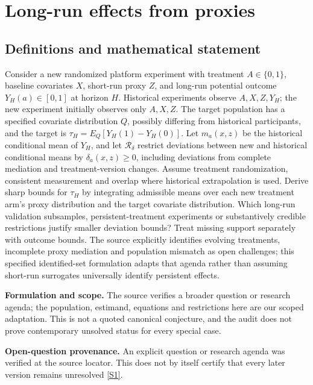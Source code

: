 \documentclass[11pt]{article}
\newcommand{\sref}[2]{\hyperlink{source:#1:#2}{[S#2]}}
\begin{document}
\section*{Long-run effects from proxies}\label{30007711}
\subsection{Definitions and mathematical statement}
Consider a new randomized platform experiment with treatment \(A\in\{0,1\}\), baseline covariates \(X\), short-run proxy \(Z\), and long-run potential outcome \(Y_H(a)\in[0,1]\) at horizon \(H\). Historical experiments observe \(A,X,Z,Y_H\); the new experiment initially observes only \(A,X,Z\). The target population has a specified covariate distribution \(Q\), possibly differing from historical participants, and the target is \(\tau_H=E_Q[Y_H(1)-Y_H(0)]\). Let \(m_a(x,z)\) be the historical conditional mean of \(Y_H\), and let \(\mathcal R_\delta\) restrict deviations between new and historical conditional means by \(\delta_a(x,z)\geq0\), including deviations from complete mediation and treatment-version changes. Assume treatment randomization, consistent measurement and overlap where historical extrapolation is used. Derive sharp bounds for \(\tau_H\) by integrating admissible means over each new treatment arm's proxy distribution and the target covariate distribution. Which long-run validation subsamples, persistent-treatment experiments or substantively credible restrictions justify smaller deviation bounds? Treat missing support separately with outcome bounds. The source explicitly identifies evolving treatments, incomplete proxy mediation and population mismatch as open challenges; this specified identified-set formulation adapts that agenda rather than assuming short-run surrogates universally identify persistent effects.

\par\textbf{Formulation and scope.} The source verifies a broader question or research agenda; the population, estimand, equations and restrictions here are our scoped adaptation. This is not a quoted canonical conjecture, and the audit does not prove contemporary unsolved status for every special case.

\par\textbf{Open-question provenance.} An explicit question or research agenda was verified at the source locator. This does not by itself certify that every later version remains unresolved \sref{30007711}{1}.
\end{document}
